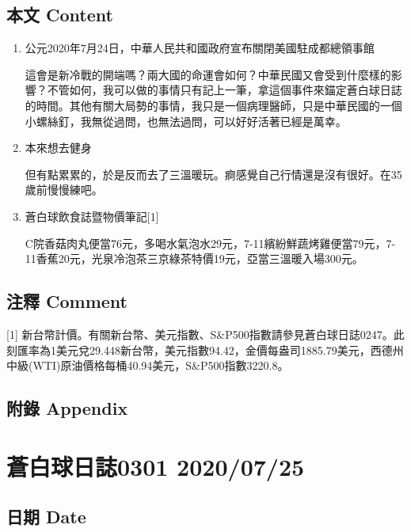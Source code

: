 \documentclass[a5paper, 11pt
]{book}
\begin{document}
\hypertarget{ux672cux6587-content-53}{%
\subsection{本文 Content}\label{ux672cux6587-content-53}}

\begin{enumerate}
\def\labelenumi{\arabic{enumi}.}
\item
  公元2020年7月24日，中華人民共和國政府宣布關閉美國駐成都總領事館

  這會是新冷戰的開端嗎？兩大國的命運會如何？中華民國又會受到什麼樣的影響？不管如何，我可以做的事情只有記上一筆，拿這個事件來錨定蒼白球日誌的時間。其他有關大局勢的事情，我只是一個病理醫師，只是中華民國的一個小螺絲釘，我無從過問，也無法過問，可以好好活著已經是萬幸。
\item
  本來想去健身

  但有點累累的，於是反而去了三溫暖玩。痾感覺自己行情還是沒有很好。在35歲前慢慢練吧。
\item
  蒼白球飲食誌暨物價筆記{[}1{]}

  C院香菇肉丸便當76元，多喝水氣泡水29元，7-11繽紛鮮蔬烤雞便當79元，7-11香蕉20元，光泉冷泡茶三京綠茶特價19元，亞當三溫暖入場300元。
\end{enumerate}

\hypertarget{ux6ce8ux91cb-comment-53}{%
\subsection{注釋 Comment}\label{ux6ce8ux91cb-comment-53}}

{[}1{]}
新台幣計價。有關新台幣、美元指數、S\&P500指數請參見蒼白球日誌0247。此刻匯率為1美元兌29.448新台幣，美元指數94.42，金價每盎司1885.79美元，西德州中級(WTI)原油價格每桶40.94美元，S\&P500指數3220.8。

\hypertarget{ux9644ux9304-appendix-53}{%
\subsection{附錄 Appendix}\label{ux9644ux9304-appendix-53}}

\hypertarget{ux84bcux767dux7403ux65e5ux8a8c0301-20200725}{%
\section{蒼白球日誌0301
2020/07/25}\label{ux84bcux767dux7403ux65e5ux8a8c0301-20200725}}

\hypertarget{ux65e5ux671f-date-54}{%
\subsection{日期 Date}\label{ux65e5ux671f-date-54}}
\end{document}
